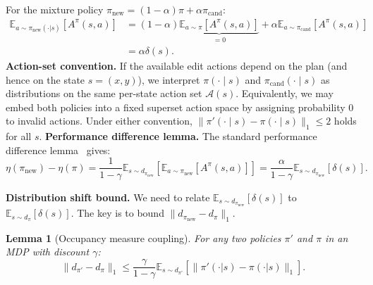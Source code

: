 \documentclass{article}
\theoremstyle{plain}
\newtheorem{lemma}[theorem]{Lemma}
\theoremstyle{definition}
\theoremstyle{remark}
\newcommand{\E}{\mathbb{E}}
\newcommand{\AAcal}{\mathcal{A}}
\begin{document}
For the mixture policy $\pi_{\mathrm{new}} = (1-\alpha)\pi + \alpha\pi_{\mathrm{cand}}$:
\begin{align}
\E_{a \sim \pi_{\mathrm{new}}(\cdot|s)}[A^\pi(s,a)]
&= (1-\alpha)\underbrace{\E_{a \sim \pi}[A^\pi(s,a)]}_{=0} + \alpha \E_{a \sim \pi_{\mathrm{cand}}}[A^\pi(s,a)] \\
&= \alpha \delta(s).
\end{align}
\textbf{Action-set convention.}
If the available edit actions depend on the plan (and hence on the state $s=(x,y)$), we interpret $\pi(\cdot\mid s)$ and
$\pi_{\mathrm{cand}}(\cdot\mid s)$ as distributions on the same per-state action set $\AAcal(s)$.
Equivalently, we may embed both policies into a fixed superset action space by assigning probability $0$ to invalid actions.
Under either convention, $\|\pi'(\cdot\mid s)-\pi(\cdot\mid s)\|_1\le 2$ holds for all $s$.
\textbf{Performance difference lemma.}
The standard performance difference lemma~\citep{KakadeLangford2002} gives:
\begin{equation}
\eta(\pi_{\mathrm{new}}) - \eta(\pi) = \frac{1}{1-\gamma} \E_{s \sim d_{\pi_{\mathrm{new}}}}[\E_{a \sim \pi_{\mathrm{new}}}[A^\pi(s,a)]] = \frac{\alpha}{1-\gamma} \E_{s \sim d_{\pi_{\mathrm{new}}}}[\delta(s)].
\end{equation}

\textbf{Distribution shift bound.}
We need to relate $\E_{s \sim d_{\pi_{\mathrm{new}}}}[\delta(s)]$ to $\E_{s \sim d_\pi}[\delta(s)]$.
The key is to bound $\|d_{\pi_{\mathrm{new}}} - d_\pi\|_1$.

\begin{lemma}[Occupancy measure coupling]
\label{lem:occupancy_coupling}
For any two policies $\pi'$ and $\pi$ in an MDP with discount $\gamma$:
\begin{equation}
\|d_{\pi'} - d_\pi\|_1 \le \frac{\gamma}{1-\gamma} \E_{s \sim d_{\pi'}}[\|\pi'(\cdot|s) - \pi(\cdot|s)\|_1].
\end{equation}
\end{lemma}
\end{document}
